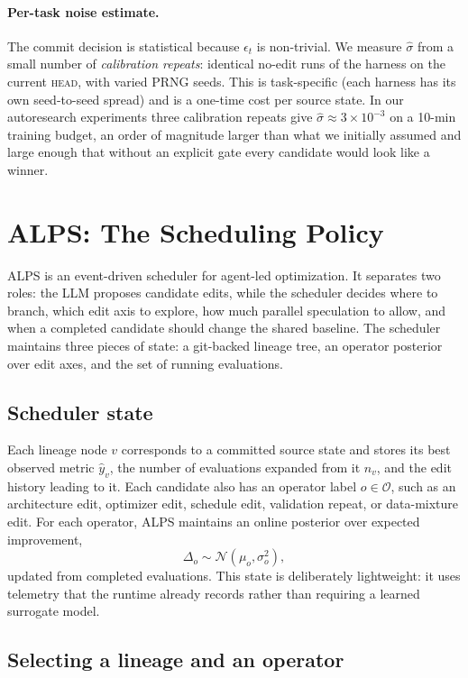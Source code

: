 \documentclass{article}
\newcommand{\alps}{ALPS\xspace}
\newcommand{\HEAD}{\textsc{head}\xspace}
\begin{document}
\paragraph{Per-task noise estimate.}
The commit decision is statistical because $\epsilon_t$ is non-trivial. We measure $\hat\sigma$ from a small number of \emph{calibration repeats}: identical no-edit runs of the harness on the current \HEAD, with varied PRNG seeds. This is task-specific (each harness has its own seed-to-seed spread) and is a one-time cost per source state. In our autoresearch experiments three calibration repeats give $\hat\sigma \approx 3 \times 10^{-3}$ on a 10-min training budget, an order of magnitude larger than what we initially assumed and large enough that without an explicit gate every candidate would look like a winner.

\section{ALPS: The Scheduling Policy}
\label{sec:alps}

\alps is an event-driven scheduler for agent-led optimization. It separates two roles: the LLM proposes candidate edits, while the scheduler decides where to branch, which edit axis to explore, how much parallel speculation to allow, and when a completed candidate should change the shared baseline. The scheduler maintains three pieces of state: a git-backed lineage tree, an operator posterior over edit axes, and the set of running evaluations.

\subsection{Scheduler state}

Each lineage node $v$ corresponds to a committed source state and stores its best observed metric $\hat y_v$, the number of evaluations expanded from it $n_v$, and the edit history leading to it. Each candidate also has an operator label $o \in \mathcal{O}$, such as an architecture edit, optimizer edit, schedule edit, validation repeat, or data-mixture edit. For each operator, \alps maintains an online posterior over expected improvement,
\[
  \Delta_o \sim \mathcal{N}(\mu_o,\sigma_o^2),
\]
updated from completed evaluations. This state is deliberately lightweight: it uses telemetry that the runtime already records rather than requiring a learned surrogate model.

\subsection{Selecting a lineage and an operator}
\end{document}
